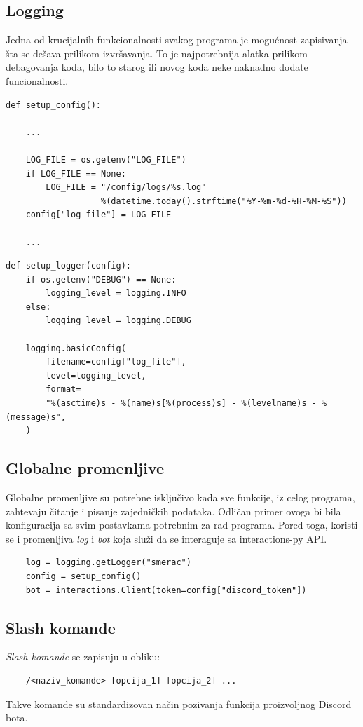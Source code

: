 \documentclass[a4paper,11pt]{article}
\begin{document}
\subsection{Logging}
Jedna od krucijalnih funkcionalnosti svakog programa je mogućnost zapisivanja šta se dešava prilikom izvršavanja. To je najpotrebnija alatka prilikom debagovanja koda, bilo to starog ili novog koda neke naknadno dodate funcionalnosti.
\begin{verbatim}
def setup_config():
    
    ...

    LOG_FILE = os.getenv("LOG_FILE")
    if LOG_FILE == None:
        LOG_FILE = "/config/logs/%s.log"
                   %(datetime.today().strftime("%Y-%m-%d-%H-%M-%S"))
    config["log_file"] = LOG_FILE
    
    ...
\end{verbatim}
\begin{verbatim}
def setup_logger(config):
    if os.getenv("DEBUG") == None:
        logging_level = logging.INFO
    else:
        logging_level = logging.DEBUG

    logging.basicConfig(
        filename=config["log_file"],
        level=logging_level,
        format=
        "%(asctime)s - %(name)s[%(process)s] - %(levelname)s - %(message)s",
    )
\end{verbatim}
\subsection{Globalne promenljive}
Globalne promenljive su potrebne isključivo kada sve funkcije, iz celog programa, zahtevaju čitanje i pisanje zajedničkih podataka. Odličan primer ovoga bi bila konfiguracija sa svim postavkama potrebnim za rad programa. Pored toga, koristi se i promenljiva \textit{log} i \textit{bot} koja služi da se interaguje sa interactions-py API.
\begin{verbatim}
    log = logging.getLogger("smerac")
    config = setup_config()
    bot = interactions.Client(token=config["discord_token"])
\end{verbatim}
\newpage
\subsection{Slash komande}
\textit{Slash komande} se zapisuju u obliku:
\begin{verbatim}
    /<naziv_komande> [opcija_1] [opcija_2] ...
\end{verbatim}
Takve komande su standardizovan način pozivanja funkcija proizvoljnog Discord bota.
\end{document}
